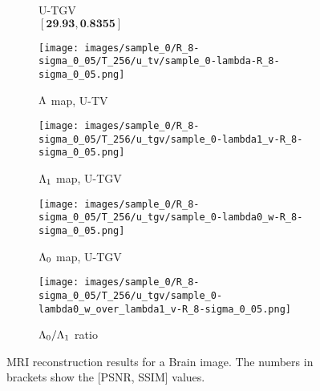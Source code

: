 \begin{figure}[!t]
\begin{subfigure}[t]{0.24\textwidth}
        \caption{U-TGV \\ $[\textbf{29.93},\textbf{0.8355}]$
        \newline}
    \end{subfigure}
    \hfill \vspace{-0.2cm}
      \begin{subfigure}[t]{0.24\textwidth}
        \texttt{[image: images/sample\_0/R\_8-sigma\_0\_05/T\_256/u\_tv/sample\_0-lambda-R\_8-sigma\_0\_05.png]}
         \captionsetup{font=small, skip=-3pt}
        \caption{$\mathrm{\Lambda}$ map, U-TV}
    \end{subfigure}
    \hfill
     \begin{subfigure}[t]{0.24\textwidth}
        \texttt{[image: images/sample\_0/R\_8-sigma\_0\_05/T\_256/u\_tgv/sample\_0-lambda1\_v-R\_8-sigma\_0\_05.png]}
         \captionsetup{font=small, skip=-3pt}
        \caption{$\mathrm{\Lambda}_{1}$ map, U-TGV}
    \end{subfigure}
    \hfill
     \begin{subfigure}[t]{0.24\textwidth}
        \texttt{[image: images/sample\_0/R\_8-sigma\_0\_05/T\_256/u\_tgv/sample\_0-lambda0\_w-R\_8-sigma\_0\_05.png]}
         \captionsetup{font=small, skip=-3pt}
        \caption{$\mathrm{\Lambda}_{0}$ map, U-TGV}
    \end{subfigure}
    \hfill
     \begin{subfigure}[t]{0.24\textwidth}
        \texttt{[image: images/sample\_0/R\_8-sigma\_0\_05/T\_256/u\_tgv/sample\_0-lambda0\_w\_over\_lambda1\_v-R\_8-sigma\_0\_05.png]}
         \captionsetup{font=small, skip=-3pt}
        \caption{$\mathrm{\Lambda}_{0}/\mathrm{\Lambda}_{1}$ ratio}
    \end{subfigure}
    \hfill

    \caption{MRI reconstruction results for a Brain image. The numbers in brackets show the [PSNR, SSIM] values. %
    }
    \label{fig:mri_results}
\end{figure}
